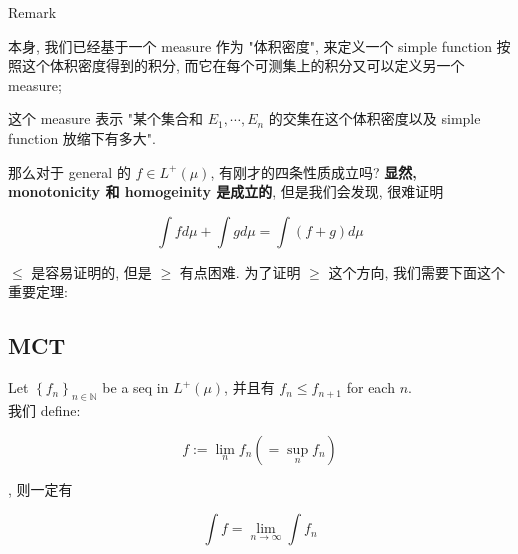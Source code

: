 \begin{qlremark}{Remark}

本身, 我们已经基于一个 measure 作为 "体积密度", 来定义一个 simple function 按照这个体积密度得到的积分, 而它在每个可测集上的积分又可以定义另一个 measure;

这个 measure 表示 "某个集合和 \(E_{1},\cdots,E_{n}\) 的交集在这个体积密度以及 simple function 放缩下有多大".

\end{qlremark}

那么对于 general 的 \(f \in L^{+}(\mu)\), 有刚才的四条性质成立吗? \textbf{显然, monotonicity 和 homogeinity 是成立的}, 但是我们会发现, 很难证明

\[\int f d\mu + \int g d\mu = \int(f + g) d\mu\]

\(\leq\) 是容易证明的, 但是 \(\geq\) 有点困难. 为了证明 \(\geq\) 这个方向, 我们需要下面这个重要定理:

\subsection{MCT}\label{mct}

\begin{theorem}{}

Let \(\left\{ f_{n} \right\}_{n \in \mathbb{N}}\) be a seq in \(L^{+}(\mu)\), 并且有 \(f_{n} \leq f_{n + 1}\) for each \(n\).\\
我们 define:

\[f := \lim\limits_{n}f_{n}( = \sup\limits_{n}f_{n})\]

, 则一定有

\[\int f = \lim\limits_{n\rightarrow\infty}\int f_{n}\]

\end{theorem}

